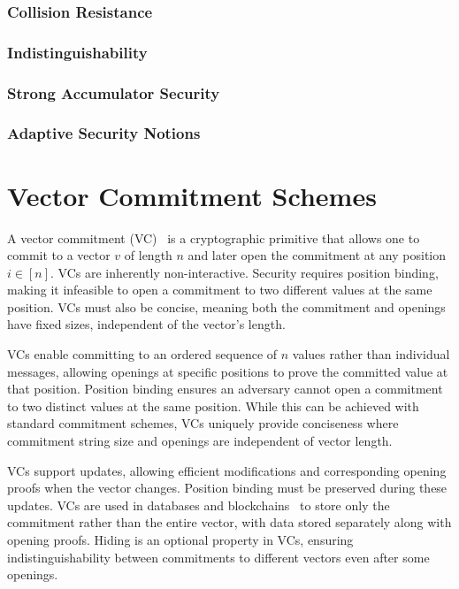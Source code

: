 \documentclass{iacrcc}
\begin{document}
\subsubsection{Collision Resistance}
\subsubsection{Indistinguishability}
\subsubsection{Strong Accumulator Security}
\subsubsection{Adaptive Security Notions}

\section{Vector Commitment Schemes}

A vector commitment (VC)~\cite{PKC:CatFio13,TCC:LibYun10} is a cryptographic primitive that allows one to commit to a vector \( v \) of length \( n \) and later open the commitment at any position \( i \in [n] \). VCs are inherently non-interactive. Security requires position binding, making it infeasible to open a commitment to two different values at the same position. VCs must also be concise, meaning both the commitment and openings have fixed sizes, independent of the vector's length.

VCs enable committing to an ordered sequence of \( n \) values rather than individual messages, allowing openings at specific positions to prove the committed value at that position. Position binding ensures an adversary cannot open a commitment to two distinct values at the same position. While this can be achieved with standard commitment schemes, VCs uniquely provide conciseness where commitment string size and openings are independent of vector length.

VCs support updates, allowing efficient modifications and corresponding opening proofs when the vector changes. Position binding must be preserved during these updates. VCs are used in databases and blockchains~\cite{EPRINT:Nguyen05} to store only the commitment rather than the entire vector, with data stored separately along with opening proofs. Hiding is an optional property in VCs, ensuring indistinguishability between commitments to different vectors even after some openings.
\end{document}
